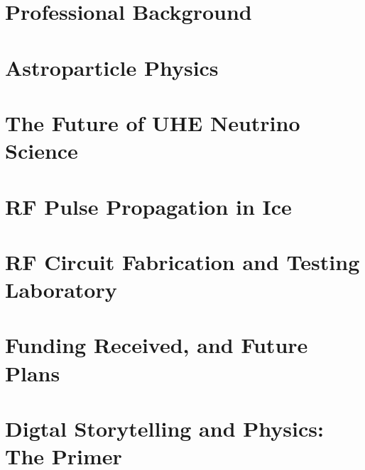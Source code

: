 \documentclass[../main.tex]{subfiles}
\begin{document}
\section{Professional Background}

\begin{flushleft}

\end{flushleft}

\section{Astroparticle Physics}

\begin{flushleft}

\end{flushleft}

\section{The Future of UHE Neutrino Science}

\begin{flushleft}

\end{flushleft}

\section{RF Pulse Propagation in Ice}

\begin{flushleft}

\end{flushleft}

\section{RF Circuit Fabrication and Testing Laboratory}
\label{sec:schol}

\begin{flushleft}

\end{flushleft}

\section{Funding Received, and Future Plans}

\begin{flushleft}

\end{flushleft}

\section{Digtal Storytelling and Physics: The Primer}

\begin{flushleft}

\end{flushleft}
\end{document}
